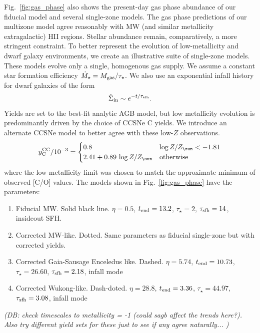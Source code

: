 \documentclass[fleqn,
usenatbib]{mnras}
\newcommand{\Ycc}{{y_{\rm C}^{\rm CC}}}
\newcommand{\Zo}{ Z_{\sun}}
\newcommand{\dbnote}[1]{ {\color{Thistle} \textit{\small (DB: #1)}} }
\begin{document}
Fig.~\ref{fig:gas_phase} also shows the present-day gas phase abundance of our fiducial model and several single-zone models. The gas phase predictions of our multizone model agree reasonably with MW (and similar metallicity extragalactic) HII regions. Stellar abundance remain, comparatively, a more stringent constraint. To better represent the evolution of low-metallicity and dwarf galaxy environments, we create an illustrative suite of single-zone models. These models evolve only a single, homogenous gas supply. We assume a constant star formation efficiency $\dot M_\star = M_{\rm gas} / \tau_\star$. We also use an exponential infall history for dwarf galaxies of the form
\begin{equation}
    \dot\Sigma_{\rm in} \sim e^{-t/\tau_{\rm sfh}}.
\end{equation}
Yields are set to the best-fit analytic AGB model, but low metallicity evolution is predominantly driven by the choice of CCSNe C yields. We introduce an alternate CCSNe model to better agree with these low-$Z$ observations.
\begin{equation} 
    \Ycc / 10^{-3} = \begin{cases}
        0.8 & \log Z / \Zo < -1.81 \\
        2.41 + 0.89\, \log Z / \Zo & {\rm otherwise }
    \end{cases}
\end{equation}
where the low-metallicity limit was chosen to match the approximate minimum of observed [C/O] values.
The models shown in Fig.~\ref{fig:gas_phase} have the parameters: 
\begin{enumerate}
    \item Fiducial MW. Solid black line. $\eta=0.5$, $t_{\rm end} = 13.2$, $\tau_\star=2$, $\tau_{\rm sfh} = 14$, insideout SFH.
    \item Corrected MW-like. Dotted. Same parameters as  fiducial single-zone but with corrected yields.
    \item Corrected Gaia-Sausage Enceledus like. Dashed. $\eta=5.74$, $t_{\rm end}=10.73$, $\tau_\star = 26.60$, $\tau_{\rm sfh} = 2.18$, infall mode
    \item Corrected Wukong-like. Dash-doted. $\eta=28.8$, $t_{\rm end} = 3.36$, $\tau_\star=44.97$, $\tau_{\rm sfh} = 3.08$, infall mode
\end{enumerate}
\dbnote{check timescales to metallicity = -1 (could sagb affect the trends here?). Also try different yield sets for these just to see if any agree naturally... }
\end{document}
